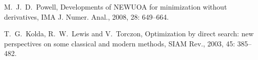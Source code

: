 \documentclass[mathpazo]{csam}
\theoremstyle{remark}
\begin{document}
\begin{thebibliography}{99}
M.~J.~D.~Powell,
Developments of NEWUOA for minimization without derivatives,
IMA J. Numer. Anal.,
2008, 28: 649--664.


%
%
%
%
%
%
%
T.~G.~Kolda, R.~W.~Lewis and V.~Torczon,
Optimization by direct search: new perspectives on some classical
and modern methods,
{SIAM Rev.}, 2003, 45: 385--482.


\end{thebibliography}
\end{document}
